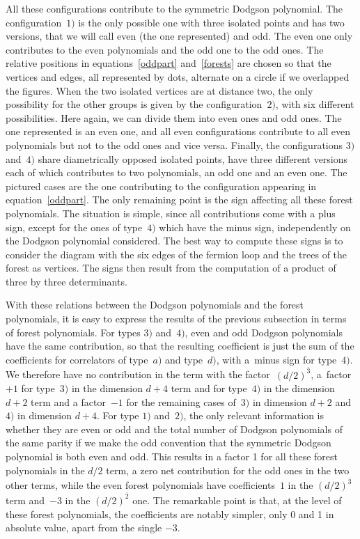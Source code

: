 \documentclass[pdftex]{sigma}
\numberwithin{equation}{section}
\begin{document}
All these configurations contribute to the symmetric Dodgson polynomial.
The configuration~$1)$ is the only possible one with three isolated points and has two versions, that we will
call even (the one represented) and odd. The even
one only contributes to the even polynomials and the odd one to the odd ones. The relative positions in
equations~\eqref{oddpart} and~\eqref{forests} are chosen so that the vertices and edges, all represented by dots,
alternate on a circle if we overlapped the figures.
When the two isolated vertices are at distance two, the only possibility for the other groups is given by the
configuration~$2)$, with six different possibilities. Here again, we can divide them into even ones and odd
ones. The one represented is an even one, and all even configurations contribute to all even polynomials but
not to the odd ones and vice versa. Finally, the configurations $3)$ and~$4)$ share diametrically opposed
isolated points, have three different versions each of which contributes to two polynomials, an odd one and an even one. The
pictured cases are the one contributing to the configuration appearing in equation~\eqref{oddpart}. The
only remaining point is the sign affecting all these forest polynomials. The situation is simple, since all
contributions come with a plus sign, except for the ones of type~$4)$ which have the minus sign, independently
on the Dodgson polynomial considered. The best way to compute these signs is to consider the diagram with the
six edges of the fermion loop and the trees of the forest as vertices. The signs then result from the
computation of a product of three by three determinants.

With these relations between the Dodgson polynomials and the forest polynomials, it is easy to express the
results of the previous subsection in terms of forest polynomials. For types $3)$ and~$4)$, even and odd Dodgson
polynomials have the same contribution, so that the resulting coefficient is
just the sum of the coefficients for correlators of type~$a)$ and type~$d)$, with a~minus sign for
type~$4)$. We therefore have no contribution in the term with the factor~$(d/2)^{\bar 3}$, a~factor~$+1$
for type~$3)$ in the dimension $d + 4$ term and for type~$4)$ in the dimension $d+2$ term and a factor~$-1$ for the
remaining cases of~$3)$ in dimension $d+2$ and $4)$ in dimension $d+4$. For type $1)$ and~$2)$, the only relevant information is
whether they are even or odd and the total number of Dodgson polynomials of the same parity if we make the odd convention
that the symmetric Dodgson polynomial is both even and odd. This results in a factor 1 for all
these forest polynomials in the $d/2$ term, a
zero net contribution for the odd ones in the two other terms, while the even forest polynomials have
coefficients~$1$ in the $(d/2)^{\bar 3}$ term and~$-3$ in the $(d/2)^{\bar 2}$ one. The remarkable point is
that, at the level of these forest polynomials, the coefficients are notably simpler, only 0 and 1 in absolute
value, apart from the single $-3$.
\end{document}
